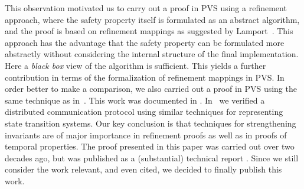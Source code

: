 This  observation motivated  us  to  carry  out a   proof  in PVS
\cite{Owre95:prolegomena} using   a  refinement approach,  where   the
safety property  itself  is formulated  as an  abstract algorithm, and
the proof  is  based  on refinement  mappings  as suggested  by
Lamport~\cite{TLA:TOPLAS94}.  This  approach   has the advantage  that  the
safety property can  be formulated more abstractly without considering
the internal structure of the final implementation.  Here a {\em black
  box} view   of the  algorithm is   sufficient.  This yields a
further contribution in terms of the 
formalization of refinement mappings in PVS.
In  order   better to make  a
comparison, we also carried out a proof in PVS using the same
technique   as  in~\cite{Rus:GC}.  This    work   was documented  in
\cite{havelund-pvs-gc-99}.
%
In~\cite{HS:BRP}  we verified  a  distributed communication  protocol
using similar techniques for representing  state transition systems. 
Our  key conclusion  is  that  techniques for
strengthening invariants are  of major importance in refinement
proofs as well as in proofs of temporal properties.  
%
The proof presented in this paper was carried out over two decades ago, but
was published as a (substantial) technical report \cite{havelund-shankar-gc-report-97}. 
Since we still consider the work relevant, and even
cited, we decided to finally publish this work.

